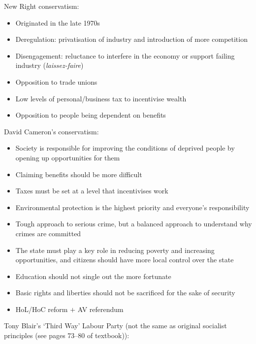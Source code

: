 \documentclass[12pt]{article}
\begin{document}
	New Right conservatism:

	\begin{itemize}
		\item{Originated in the late 1970s}
		\item{Deregulation: privatisation of industry and introduction of more competition}
		\item{Disengagement: reluctance to interfere in the economy or support failing industry (\textsl{laissez-faire})}

		\item{Opposition to trade unions}
		\item{Low levels of personal\slash business tax to incentivise wealth}
		\item{Opposition to people being dependent on benefits}
	\end{itemize}

	David Cameron's conservatism:

	\begin{itemize}
		\item{Society is responsible for improving the conditions of deprived people by opening up opportunities for them}
		\item{Claiming benefits should be more difficult}
		\item{Taxes must be set at a level that incentivises work}
		\item{Environmental protection is the highest priority and everyone's responsibility}
		\item{Tough approach to serious crime, but a balanced approach to understand why crimes are committed}
		\item{The state must play a key role in reducing poverty and increasing opportunities, and citizens should have more local control over the state}
		\item{Education should not single out the more fortunate}
		\item{Basic rights and liberties should not be sacrificed for the sake of security}
		\item{HoL\slash HoC reform $+$ AV referendum}
	\end{itemize}

	Tony Blair's `Third Way' Labour Party (not the same as original socialist principles (see pages 73--80 of textbook)):
\end{document}
